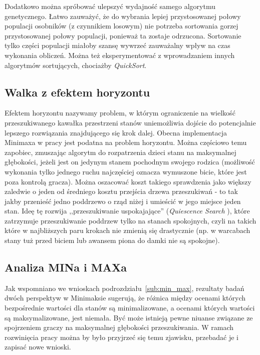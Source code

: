 Dodatkowo można spróbować ulepszyć wydajność samego algorytmu genetycznego. Łatwo zauważyć, że do wybrania lepiej przystosowanej połowy populacji osobników (z czynnikiem losowym) nie potrzeba sortowania gorzej przystosowanej połowy populacji, ponieważ ta zostaje odrzucona. Sortowanie tylko części populacji miałoby szansę wywrzeć zauważalny wpływ na czas wykonania obliczeń. Można też eksperymentować z wprowadzaniem innych algorytmów sortujących, chociażby \textit{QuickSort}.

\subsection{Walka z efektem horyzontu}

Efektem horyzontu nazywamy problem, w którym ograniczenie na wielkość przeszukiwanego kawałka przestrzeni stanów uniemożliwia dojście do potencjalnie lepszego rozwiązania znajdującego się krok dalej. Obecna implementacja Minimaxa w pracy jest podatna na problem horyzontu. Można częściowo temu zapobiec, zmuszając algorytm do rozpatrzenia dzieci stanu na maksymalnej głębokości, jeżeli jest on jedynym stanem pochodnym swojego rodzica (możliwość wykonania tylko jednego ruchu najczęściej oznacza wymuszone bicie, które jest poza kontrolą gracza). Można oszacować koszt takiego sprawdzenia jako większy zaledwie o jeden od średniego kosztu przejścia drzewa przeszukiwań - to tak jakby przenieść jedno poddrzewo o rząd niżej i umieścić w jego miejsce jeden stan. Ideę tę rozwija ,,przeszukiwanie uspokajające'' (\textit{Quiescence Search} \cite{QSearch}), które zatrzymuje przeszukiwanie poddrzew tylko na stanach spokojnych, czyli na takich które w najbliższych paru krokach nie zmienią się drastycznie (np. w warcabach stany tuż przed biciem lub awansem piona do damki nie są spokojne).

\subsection{Analiza MINa i MAXa}

Jak wspomniano we wnioskach podrozdziału~\ref{sub:min_max}, rezultaty badań dwóch perspektyw w Minimaksie sugerują, że różnica między ocenami których bezpośrednie wartości dla stanów są minimalizowane, a ocenami których wartości są maksymalizowane, jest niemała. Być może istnieją pewne niuanse związane ze spojrzeniem graczy na maksymalnej głębokości przeszukiwania. W ramach rozwinięcia pracy można by było przyjrzeć się temu zjawisku, przebadać je i zapisać nowe wnioski.

